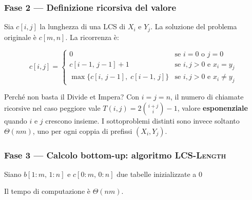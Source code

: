\subsubsection{Fase 2 — Definizione ricorsiva del valore}

Sia $c[i,j]$ la lunghezza di una LCS di $X_i$ e $Y_j$.
La soluzione del problema originale è $c[m, n]$.
La ricorrenza è:

\[
c[i,j] =
\begin{cases}
0 & \text{se } i = 0 \text{ o } j = 0 \\
c[i-1,\, j-1] + 1 & \text{se } i,j > 0 \text{ e } x_i = y_j \\
\max\{c[i,\, j-1],\; c[i-1,\, j]\} & \text{se } i,j > 0 \text{ e } x_i \neq y_j
\end{cases}
\]

\begin{hardnote}
Perché non basta il Divide et Impera? Con $i = j = n$, il numero di chiamate
ricorsive nel caso peggiore vale $T(i,j) = 2\binom{i+j}{i} - 1$, valore
\textbf{esponenziale} quando $i$ e $j$ crescono insieme. I sottoproblemi distinti
sono invece soltanto $\Theta(nm)$, uno per ogni coppia di prefissi $(X_i, Y_j)$.
\end{hardnote}

\subsubsection{Fase 3 — Calcolo bottom-up: algoritmo \textsc{LCS-Length}}

\begin{algorithm}[H]
\caption{\textsc{LCS-Length}$(X, Y)$}

Siano $b[1{:}m,\,1{:}n]$ e $c[0{:}m,\,0{:}n]$ due tabelle inizializzate a $0$

\end{algorithm}

Il tempo di computazione è $\Theta(nm)$.

